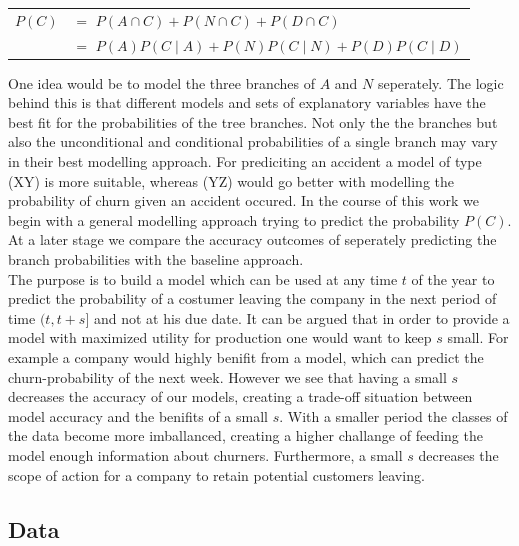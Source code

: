 \documentclass[12pt,titlepage]{article}
\begin{document}
\begin{center}
    \begin{tabular}{ll}
        $P(C)$ & $=$ \hspace{3mm} $P(A\cap C) + P(N\cap C) + P(D\cap C)$ \\
        & $=$ \hspace{3mm} $P(A)P(C\mid A) + P(N)P(C\mid N) + P(D)P(C\mid D)$ \\
    \end{tabular}
\end{center} \par

One idea would be to model the three branches of $A$ and $N$ seperately. The logic behind this is that different models and sets of explanatory variables have the best fit for the probabilities of the tree branches. Not only the the branches but also the unconditional and conditional probabilities of a single branch may vary in their best modelling approach. For prediciting an accident a model of type (XY) is more suitable, whereas (YZ) would go better with modelling the probability of churn given an accident occured. In the course of this work we begin with a general modelling approach trying to predict the probability $P(C)$. At a later stage we compare the accuracy outcomes of seperately predicting the branch probabilities with the baseline approach. \\
The purpose is to build a model which can be used at any time $t$ of the year to predict the probability of a costumer leaving the company in the next period of time $(t, t+s]$ and not at his due date. It can be argued that in order to provide a model with maximized utility for production one would want to keep $s$ small. For example a company would highly benifit from a model, which can predict the churn-probability of the next week. However we see that having a small $s$ decreases the accuracy of our models, creating a trade-off situation between model accuracy and the benifits of a small $s$. With a smaller period the classes of the data become more imballanced, creating a higher challange of feeding the model enough information about churners. Furthermore, a small $s$ decreases the scope of action for a company to retain potential customers leaving. \\

\subsection{Data} \par
\end{document}
